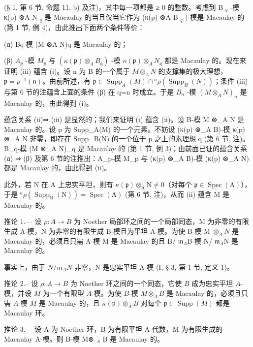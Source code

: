 (§ 1, 第 6 节, 命题 11, b) 及注)，其中每一项都是 ≥ 0 的整数。考虑到 B \(_{q}\) -模 κ(p) ⊗A N \(_{q}\) 是 Macaulay 的当且仅当它作为 (κ(p) ⊗A B \(_{q}\) )-模是 Macaulay 的 (第 1 节, 例 4)，由此推出下面两个条件等价：

(α) Bq-模 (M ⊗A N)q 是 Macaulay 的；

(β) \(A_{p}\) -模 \(M_{p}\) 与 \((\kappa(\mathfrak{p})\otimes_{A}B_{\mathfrak{q}})\) -模 \(\kappa(\mathfrak{p})\otimes_{A}N_{\mathfrak{q}}\) 都是 Macaulay 的。现在来证明 (iii) 蕴含 (i)。设 n 为 B 的一个属于 \(M\otimes_{A}N\) 的支撑集的极大理想，\(\mathfrak{p}=\rho^{-1}(\mathfrak{n})\)。由前所述，有 \(\mathfrak{p}\in\operatorname{Supp}_{A}(M)\cap{}^{a}\rho(\operatorname{Supp}_{B}(N))\)；条件 (iii) 与第 6 节的注蕴含上面的条件 (β) 在 q=n 时成立。于是 \(B_{n}\) -模 \((M\otimes_{A}N)_{n}\) 是 Macaulay 的，由此得到 (i)。

蕴含关系 (ii)⇒ (iii) 是显然的；我们来证明 (i) 蕴含 (ii)。设 B-模 M ⊗\_A N 是 Macaulay 的。设 p 为 Supp\_A(M) 的一个元素。不妨设 (κ(p) ⊗\_A B)-模 κ(p) ⊗\_A N 非零，即存在 Supp\_B(N) 的一个位于 p 之上的素理想 q (第 6 节, 注)。B\_q-模 (M ⊗\_A N)\_q 是 Macaulay 的 (第 1 节, 例 3)；由前面已证的蕴含关系 (α) ⇒ (β) 及第 6 节的注推出：A\_p-模 M\_p 与 (κ(p) ⊗\_A B)-模 (κ(p) ⊗\_A N) 都是 Macaulay 的，由此得到 (ii)。

此外，若 N 在 A 上忠实平坦，则有 \(\kappa(\mathfrak{p})\otimes_{\mathrm{A}}\mathrm{N}\neq 0\)（对每个 \(\mathfrak{p}\in\operatorname{Spec}(\mathrm{A})\)），于是 \({}^{a}\rho(\operatorname{Supp}_{\mathrm{B}}(\mathrm{N}))=\operatorname{Spec}(\mathrm{A})\) (第 6 节, 注)，从而 (ii) 蕴含 M 是 Macaulay 的。

推论 1.--- 设 \(\rho: A \to B\) 为 Noether 局部环之间的一个局部同态，M 为非零的有限生成 A-模，N 为非零的有限生成 B-模且为平坦 A-模。为使 B-模 M \(\otimes_{A}N\) 是 Macaulay 的，必须且只需 A-模 M 是 Macaulay 的且 B/ \(\mathfrak{m}_{A}\)B-模 N/ \(\mathfrak{m}_{A}\)N 是 Macaulay 的。

事实上，由于 \(N/m_{A}N\) 非零，N 是忠实平坦 A-模 (I, § 3, 第 1 节, 定义 1)。

推论 2.-- 设 \(\rho: A \to B\) 为 Noether 环之间的一个同态，它使 \(B\) 成为忠实平坦 \(A\)-模，并设 \(M\) 为一个有限型 \(A\)-模。为使 \(B\)-模 \(M \otimes_{A} B\) 是 Macaulay 的，必须且只需 \(A\)-模 \(M\) 是 Macaulay 的，且 \(\kappa(\mathfrak{p}) \otimes_{A} B\) 对每个 \(\mathfrak{p} \in \operatorname{Supp}(M)\) 都是 Macaulay 环。

推论 3.--- 设 A 为 Noether 环，B 为有限平坦 A-代数，M 为有限生成的 Macaulay A-模。则 B-模 M⊗ \(_{A}\) B 是 Macaulay 的。

